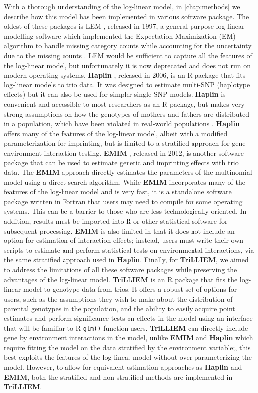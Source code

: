 With a thorough understanding of the log-linear model, in \cref{chap:methods} we describe how this model has been implemented in various software package.
The oldest of these packages is LEM \cite{Verm97}, released in 1997, a general purpose log-linear modelling software which implemented the Expectation-Maximization (EM) algorithm to handle missing category counts while accounting for the uncertainty due to the missing counts \cite{Loui82,Demp+77,Lang92}.
LEM would be sufficient to capture all the features of the log-linear model, but unfortunately it is now deprecated and does not run on modern operating systems.
\textbf{Haplin} \cite{GjesLie06}, released in 2006, is an R package that fits log-linear models to trio data.
It was designed to estimate multi-SNP (haplotype effects) but it can also be used for simpler single-SNP models.
\textbf{Haplin} is convenient and accessible to most researchers as an R package, but makes very strong assumptions on how the genotypes of mothers and fathers are distributed in a population, which have been violated in real-world populations \cite{Bour+11}.
\textbf{Haplin} offers many of the features of the log-linear model, albeit with a modified parameterization for imprinting, but is limited to a stratified approach for gene-environment interaction testing.
\textbf{EMIM} \cite{HoweCord12}, released in 2012, is another software package that can be used to estimate genetic and imprinting effects with trio data.
The \textbf{EMIM} approach directly estimates the parameters of the multinomial model using a direct search algorithm.
While \textbf{EMIM} incorporates many of the features of the log-linear model and is very fast, it is a standalone software package written in Fortran that users may need to compile for some operating systems.
This can be a barrier to those who are less technologically oriented.
In addition, results must be imported into R or other statistical software for subsequent processing.
\textbf{EMIM} is also limited in that it does not include an option for estimation of interaction effects; instead, users must write their own scripts to estimate and perform statistical tests on environmental interactions, via the same stratified approach used in \textbf{Haplin}.
Finally, for \textbf{TriLLIEM}, we aimed to address the limitations of all these software packages while preserving the advantages of the log-linear model.
\textbf{TriLLIEM} is an R package that fits the log-linear model to genotype data from trios.
It offers a robust set of options for users, such as the assumptions they wish to make about the distribution of parental genotypes in the population, and the ability to easily acquire point estimates and perform significance tests on effects in the model using an interface that will be familiar to R \texttt{glm()} function users.
\textbf{TriLLIEM} can directly include gene by environment interactions in the model, unlike \textbf{EMIM} and \textbf{Haplin} which require fitting the model on the data stratified by the environment variable;, this best exploits the features of the log-linear model without over-parameterizing the model.
However, to allow for equivalent estimation approaches as \textbf{Haplin} and \textbf{EMIM}, both the stratified and non-stratified methods are implemented in \textbf{TriLLIEM}.

